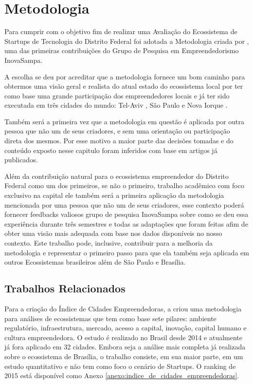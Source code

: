 \chapter[Metodologia]{Metodologia}
\label{cap-metodologia}

Para cumprir com o objetivo fim de realizar uma Avaliação do Ecossistema de Startups de Tecnologia do Distrito Federal foi adotada a Metodologia criada por , uma das primeiras contribuições do Grupo de Pesquisa em Empreendedorismo InovaSampa. 

A escolha se deu por acreditar que a metodologia fornece um bom caminho para obtermos uma visão geral e realista do atual estado do ecossistema local por ter como base uma grande participação dos empreendedores locais e já ter sido executada em três cidades do mundo: Tel-Aviv , São Paulo  e Nova Iorque . 

Também será a primeira vez que a metodologia em questão é aplicada por outra pessoa que não um de seus criadores, e sem uma orientação ou participação direta dos mesmos. Por esse motivo a maior parte das decisões tomadas e do conteúdo exposto nesse capitulo foram inferidos com base em artigos já publicados. 

Além da contribuição natural para o ecossistema empreendedor do Distrito Federal como um dos primeiros, se não o primeiro, trabalho acadêmico com foco exclusivo na capital ele também será a primeira aplicação da metodologia mencionada por uma pessoa que não um de seus criadores, esse contexto poderá fornecer feedbacks valiosos grupo de pesquisa InovaSampa sobre como se deu essa experiência durante três semestres e todas as adaptações que foram feitas afim de obter uma visão mais adequada com base nos dados disponíveis no nosso contexto. Este trabalho pode, inclusive, contribuir para a melhoria da metodologia e representar o primeiro passo para que ela também seja aplicada em outros Ecossistemas brasileiros além de São Paulo e Brasília.

\section{Trabalhos Relacionados}
\label{section:trabalhos_relacionados}

Para a criação do Índice de Cidades Empreendedoras, a  criou uma metodologia para análises de ecossistemas que tem como base sete pilares: ambiente regulatório, infraestrutura, mercado, acesso a capital, inovação, capital humano e cultura empreendedora. O estudo é realizado no Brasil desde 2014 e atualmente já fora aplicado em 32 cidades. Embora seja a análise mais completa já realizada sobre o ecossistema de Brasília, o trabalho consiste, em sua maior parte, em um estudo quantitativo e não tem como foco o cenário de Startups. O ranking de 2015 está disponível como Anexo \ref{anexo:indice_de_cidades_empreendedoras}.

